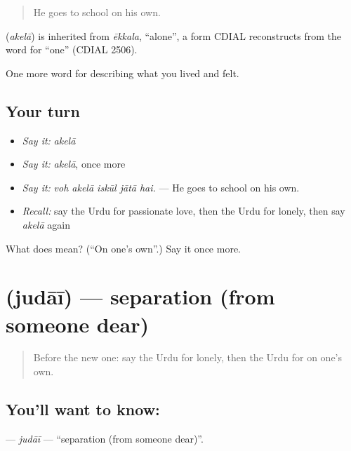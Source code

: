 \begin{quote}
He goes to school on his own.
\end{quote}

\begin{cousinweb}
\textbf{} (\emph{akelā}) is inherited from \emph{ēkkala}, \textquotedblleft{}alone\textquotedblright{}, a form CDIAL reconstructs from the word for \textquotedblleft{}one\textquotedblright{} (CDIAL 2506).
\end{cousinweb}

\begin{grammarlens}[title={What you've built}]
One more word for describing what you lived and felt.
\end{grammarlens}

\subsection*{Your turn}
\begin{itemize}
\raggedright
  \item \emph{Say it:} \emph{akelā}
  \item \emph{Say it:} \emph{akelā}, once more
  \item \emph{Say it:} \emph{voh akelā iskūl jātā hai.} — He goes to school on his own.
  \item \emph{Recall:} say the Urdu for passionate love, then the Urdu for lonely, then say \emph{akelā} again
\end{itemize}

\begin{tcolorbox}[breakable,colback=teal!4,colframe=teal!35!black,title={Before you move on}]
What does  mean? (\textquotedblleft{}On one's own\textquotedblright{}.) Say it once more.
\end{tcolorbox}
\section[\texorpdfstring{\ur{جدائی} (judāī)}{جدائی (judāī)}]{ (judāī) — separation (from someone dear)}

\label{lesson:UR-C450-judai}



\begin{quote}
Before the new one: say the Urdu for lonely, then the Urdu for on one's own.
\end{quote}

\subsection*{You'll want to know: }
\textbf{} — \emph{judāī} — \textquotedblleft{}separation (from someone dear)\textquotedblright{}.

